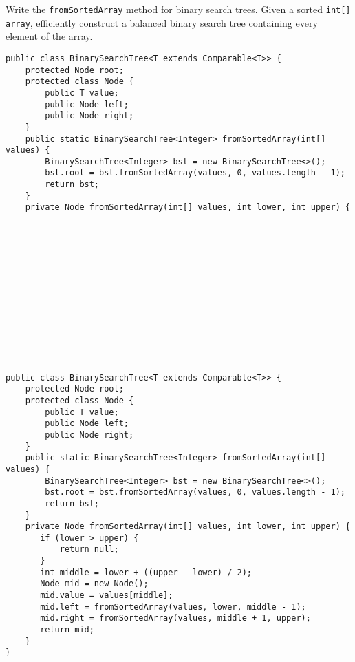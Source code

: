 \question Write the \texttt{fromSortedArray} method for binary search trees. Given a sorted \texttt{int[] array}, efficiently construct a balanced binary search tree containing every element of the array.

\ifprintanswers
\else
\begin{lstlisting}
public class BinarySearchTree<T extends Comparable<T>> {
    protected Node root;
    protected class Node {
        public T value;
        public Node left;
        public Node right;
    }
    public static BinarySearchTree<Integer> fromSortedArray(int[] values) {
        BinarySearchTree<Integer> bst = new BinarySearchTree<>();
        bst.root = bst.fromSortedArray(values, 0, values.length - 1);
        return bst;
    }
    private Node fromSortedArray(int[] values, int lower, int upper) {














\end{lstlisting}
\fi

\begin{solution}
\begin{lstlisting}
public class BinarySearchTree<T extends Comparable<T>> {
    protected Node root;
    protected class Node {
        public T value;
        public Node left;
        public Node right;
    }
    public static BinarySearchTree<Integer> fromSortedArray(int[] values) {
        BinarySearchTree<Integer> bst = new BinarySearchTree<>();
        bst.root = bst.fromSortedArray(values, 0, values.length - 1);
        return bst;
    }
    private Node fromSortedArray(int[] values, int lower, int upper) {
       if (lower > upper) {
           return null;
       }
       int middle = lower + ((upper - lower) / 2);
       Node mid = new Node();
       mid.value = values[middle];
       mid.left = fromSortedArray(values, lower, middle - 1);
       mid.right = fromSortedArray(values, middle + 1, upper);
       return mid;
    }
}
\end{lstlisting}
\end{solution}
